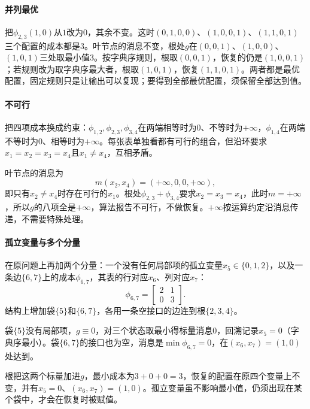 \paragraph{并列最优}
把$\phi_{2,3}(1,0)$从$1$改为$0$，其余不变。这时$(0,1,0,0)$、$(1,0,0,1)$、$(1,1,0,1)$三个配置的成本都是$3$。叶节点的消息不变，根处$g$在$(0,0,1)$、$(1,0,0)$、$(1,0,1)$三处取最小值$3$。按字典序规则，根取$(0,0,1)$，恢复的仍是$(1,0,0,1)$；若规则改为取字典序最大者，根取$(1,0,1)$，恢复$(1,1,0,1)$。两者都是最优配置，固定规则只是让输出可以复现；要得到全部最优配置，须保留全部达到值。

\paragraph{不可行}
把四项成本换成约束：$\phi_{1,2},\phi_{2,3},\phi_{3,4}$在两端相等时为$0$、不等时为$+\infty$，$\phi_{1,4}$在两端不等时为$0$、相等时为$+\infty$。每张表单独看都有可行的组合，但沿环要求$x_1=x_2=x_3=x_4$且$x_1\neq x_4$，互相矛盾。

叶节点的消息为
\[
m(x_2,x_4)=(+\infty,0,0,+\infty),
\]
即只有$x_2\neq x_4$时存在可行的$x_1$。根处$\phi_{2,3}+\phi_{3,4}$要求$x_2=x_3=x_4$，此时$m=+\infty$，所以$g$的八项全是$+\infty$，算法报告不可行，不做恢复。$+\infty$按运算约定沿消息传递，不需要特殊处理。

\paragraph{孤立变量与多个分量}
在原问题上再加两个分量：一个没有任何局部项的孤立变量$x_5\in\{0,1,2\}$，以及一条边$\{6,7\}$上的成本$\phi_{6,7}$，其表的行对应$x_6$、列对应$x_7$：
\[
\phi_{6,7}=\begin{bmatrix}2&1\\0&3\end{bmatrix}.
\]
结构上增加袋$\{5\}$和$\{6,7\}$，各用一条空接口的边连到根$\{2,3,4\}$。

袋$\{5\}$没有局部项，$g\equiv0$，对三个状态取最小得标量消息$0$，回溯记录$x_5=0$（字典序最小）。袋$\{6,7\}$的接口也为空，消息是$\min\phi_{6,7}=0$，在$(x_6,x_7)=(1,0)$处达到。

根把这两个标量加进$g$，最小成本为$3+0+0=3$，恢复的配置在原四个变量上不变，并有$x_5=0$、$(x_6,x_7)=(1,0)$。孤立变量虽不影响最小值，仍须出现在某个袋中，才会在恢复时被赋值。
